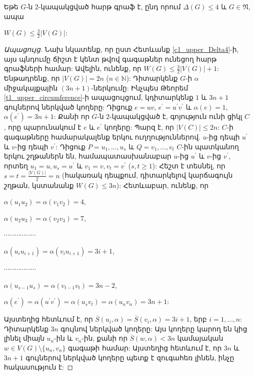 \begin{corollary}
\label{c1_upper_Delta4_planar} Եթե $G$-ն $2$-կապակցված հարթ գրաֆ է, ընդ որում
$\Delta(G)\leq 4$ և $G\in \mathfrak{N}$, ապա
\begin{center}
$W(G)\leq \frac{3}{2}\vert V(G)\vert$:
\end{center}
\end{corollary}
\begin{proof}[Ապացույց] Նախ նկատենք, որ ըստ Հետևանք \ref{c1_upper_Delta4}-ի, այս պնդումը ճիշտ է կենտ թվով գագաթներ ունեցող հարթ գրաֆների համար: Ավելին, ունենք, որ $W(G)\leq \frac{3}{2}\vert V(G)\vert+1$: Ենթադրենք, որ $\vert V(G)\vert =2n$ ($n\in \mathbb{N}$): Դիտարկենք $G$-ի $\alpha$ միջակայքային $(3n+1)$-ներկումը:
Ինչպես Թեորեմ \ref{t1_upper_circumference}-ի ապացույցում, կդիտարկենք $1$ և $3n+1$ գույներով ներկված կողերը: Դիցուք $e=uv$, $e^{\prime}=u^{\prime}v^{\prime}$ և $\alpha(e)=1$,
$\alpha(e^{\prime})=3n+1$: Քանի որ $G$-ն $2$-կապակցված է, գոյություն ունի ցիկլ $C$, որը պարունակում է $e$ և $e^{\prime}$ կողերը: 
Պարզ է, որ $\vert V(C)\vert\leq 2n$: 
$C$-ի գագաթները համարակալենք երկու ուղղություններով. $u$-ից դեպի
$u^{\prime}$ և $v$-ից դեպի $v^{\prime}$: Դիցուք
$P=u_{1},\ldots,u_{s}$ և $Q=v_{1},\ldots,v_{t}$ $C$-ին պատկանող երկու շղթաներն են, համապատասխանաբար $u$-ից $u^{\prime}$ և $v$-ից $v^{\prime}$, որտեղ
$u_{1}=u,u_{s}=u^{\prime}$ և $v_{1}=v,v_{t}=v^{\prime}$
($s,t\geq 1$): Հեշտ է տեսնել, որ
$s=t=\frac{\vert V(G)\vert}{2}=n$ (հակառակ դեպքում, դիտարկելով կարճագույն շղթան, կստանանք $W(G)\leq 3n$): Հետևաբար, ունենք, որ

\begin{center}
$\alpha(u_{1}u_{2})=\alpha(v_{1}v_{2})=4$,

$\alpha(u_{2}u_{3})=\alpha(v_{2}v_{3})=7$,

$\cdots \cdots \cdots \cdots \cdots \cdots$

$\alpha(u_{i}u_{i+1})=\alpha(v_{i}u_{i+1})=3i+1$,

$\cdots \cdots \cdots \cdots \cdots \cdots$

$\alpha(u_{s-1}u_{s})=\alpha(v_{t-1}v_{t})=3n-2$,

$\alpha(e^{\prime})=\alpha(u^{\prime}v^{\prime})=\alpha(u_{s}v_{t})=\alpha(u_{n}v_{n})=3n+1$:
\end{center}

Այստեղից հետևում է, որ $\overline S\left(u_{i},\alpha\right)=\overline
S\left(v_{i},\alpha\right)=3i+1$, երբ $i=1,\ldots,n$: Դիտարկենք $3n$ գույնով ներկված կողերը: Այս կողերը կարող են կից լինել միայն $u_{n}$-ին և $v_{n}$-ին, քանի որ 
$\overline S\left(w,\alpha\right)<3n$ կամայական 
$w\in V(G)\setminus\{u_{n},v_{n}\}$ գագաթի համար: Այստեղից հետևում է, որ $3n$ և $3n+1$ գույներով ներկված կողերը պետք է զուգահեռ լինեն, ինչը հակասություն է:
\end{proof}

